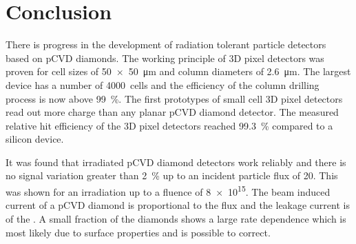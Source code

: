 \section{Conclusion}
There is progress in the development of radiation tolerant particle detectors based on \ac{pCVD} diamonds. The working principle of 3D pixel detectors was proven for cell sizes of \SI{50x50}{\micro\meter} and column diameters of \SI{2.6}{\micro\meter}. The largest device has a number of \SI{4000}{cells} and the efficiency of the column drilling process is now above \SI{99}{\%}. The first prototypes of small cell 3D pixel detectors read out more charge than any planar \ac{pCVD} diamond detector. The measured relative hit efficiency of the 3D pixel detectors reached \SI{99.3}{\%} compared to a silicon device.\par
It was found that irradiated \ac{pCVD} diamond detectors work reliably and there is no signal variation greater than \SI{2}{\%} up to an incident particle flux of \SI{20}{\mhzcm}. This was shown for an irradiation up to a fluence of \SI{8e15}{\ncm}. The beam induced current of a \ac{pCVD} diamond is proportional to the flux and the leakage current is of the . A small fraction of the diamonds shows a large rate dependence which is most likely due to surface properties and is possible to correct.
